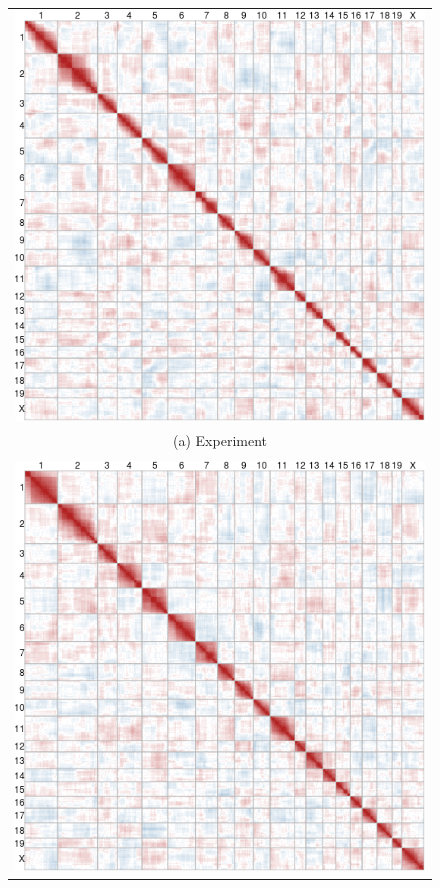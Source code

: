 \documentclass[sts]{imsart}
\begin{document}
\begin{figure}[h!]
  \begin{center}
    \begin{tabular}{c}
      \includegraphics[scale = 0.3]{../img/jaxbsb.png} \\
      {\footnotesize (a) Experiment} \\
      \\
      \includegraphics[scale = 0.3]{../img/jaxbsb_sim.png} \\

\end{tabular}
\end{center}
\end{figure}
\end{document}
